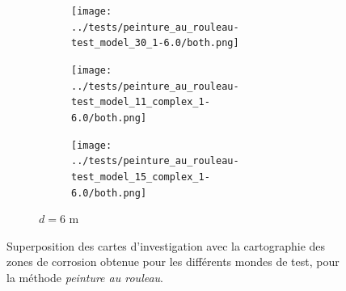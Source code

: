 \documentclass[english,RandD]{rapportPFE}  %
\begin{document}
\begin{figure}[H]
\begin{subfigure}[t]{\linewidth}
\begin{subfigure}[t]{0.11\linewidth}
					\texttt{[image: ../tests/peinture\_au\_rouleau-test\_model\_30\_1-6.0/both.png]}
				\end{subfigure}
				\hfill
				\begin{subfigure}[t]{0.11\linewidth}
					\texttt{[image: ../tests/peinture\_au\_rouleau-test\_model\_11\_complex\_1-6.0/both.png]}
				\end{subfigure}
				\hfill
				\begin{subfigure}[t]{0.11\linewidth}
					\texttt{[image: ../tests/peinture\_au\_rouleau-test\_model\_15\_complex\_1-6.0/both.png]}
				\end{subfigure}
				\caption{$d = 6$ m}
			\end{subfigure}
			\caption{Superposition des cartes d'investigation avec la cartographie des zones de corrosion obtenue pour les différents mondes de test, pour la méthode \textit{peinture au rouleau}.}
			\label{fig:peinture_au_rouleau_resultats}
		\end{figure}
\end{document}
